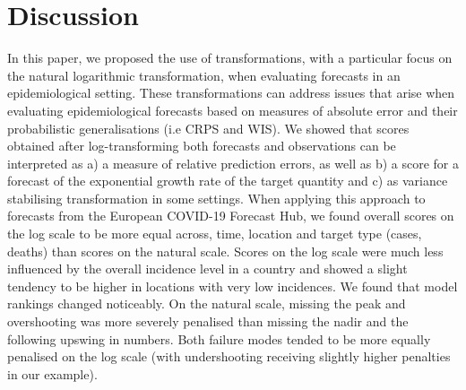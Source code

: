 \documentclass{article}
\begin{document}




\section{Discussion}
\label{sec:discussion}

In this paper, we proposed the use of transformations, with a particular focus on the natural logarithmic transformation, when evaluating forecasts in an epidemiological setting. These transformations can address issues that arise when evaluating epidemiological forecasts based on measures of absolute error and their probabilistic generalisations (i.e CRPS and WIS). We showed that scores obtained after log-transforming both forecasts and observations can be interpreted as a) a measure of relative prediction errors, as well as b) a score for a forecast of the exponential growth rate of the target quantity and c) as variance stabilising transformation in some settings.
When applying this approach to forecasts from the European COVID-19 Forecast Hub, we found overall scores on the log scale to be more equal across, time, location and target type (cases, deaths) than scores on the natural scale. Scores on the log scale were much less influenced by the overall incidence level in a country and showed a slight tendency to be higher in locations with very low incidences. We found that model rankings changed noticeably. 
On the natural scale, missing the peak and overshooting was more severely penalised than missing the nadir and the following upswing in numbers. Both failure modes tended to be more equally penalised on the log scale (with undershooting receiving slightly higher penalties in our example). 
\end{document}
